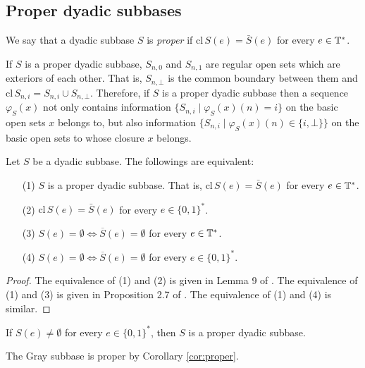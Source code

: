 \documentclass{eptcs-modified}
\begin{document}
\subsection{Proper dyadic subbases}

\begin{definition}
We say that a dyadic subbase $S$ is {\em proper} if
$\textrm{cl}\,S(e)=\bar{S}(e)$ for every $e \in \mathbb{T}^*$.
\end{definition}

If $S$ is a proper dyadic subbase,
$S_{n,0}$ and  $S_{n,1}$ are regular open sets which are exteriors of each other.  That is, $S_{n,\bot}$ is the common boundary between them and
$\textrm{cl}\, S_{n,i} = S_{n,i} \cup S_{n,\bot}$.
Therefore, if $S$ is a proper dyadic subbase then
a sequence $\varphi_S(x)$
not only contains information
$\{S_{n,i} \mid \varphi_S(x)(n) = i\}$ on
the basic open sets $x$ belongs to, but also information
$\{S_{n,i} \mid \varphi_S(x)(n) \in \{i,\bot\}\}$
on the basic open sets to whose closure $x$ belongs.

\begin{proposition}
\label{prop:propercharac}
Let $S$ be a dyadic subbase.   The followings are equivalent:
\begin{itemize}
\item[(1)] $S$ is a proper dyadic subbase.  That is, $\textrm{cl}\,S(e)=\bar{S}(e)$ for every $e \in \mathbb{T}^*$.
\item[(2)] $\textrm{cl}\,S(e)=\bar{S}(e)$ for every $e \in \{0,1\}^*$.
\item[(3)] $S(e) = \emptyset \Leftrightarrow \overline{S}(e) = \emptyset$
for every $e \in \mathbb{T}^*$.
\item[(4)] $S(e) = \emptyset \Leftrightarrow \overline{S}(e) = \emptyset$
for every $e \in \{0,1\}^*$.
\end{itemize}
\begin{proof} The equivalence of (1) and (2) is given in Lemma 9 of \cite{tsuiki2}.
The equivalence of (1) and (3) is given in Proposition 2.7 of \cite{tsuiki3}.
The equivalence of (1) and (4) is similar.
\end{proof}
\end{proposition}

\begin{corollary}\label{cor:proper}
  If $S(e) \ne \emptyset$ for every $e \in \{0,1\}^*$, then $S$ is a proper dyadic subbase.
\end{corollary}

\begin{example}
  The Gray subbase is proper by Corollary \ref{cor:proper}.
\end{example}
\end{document}

